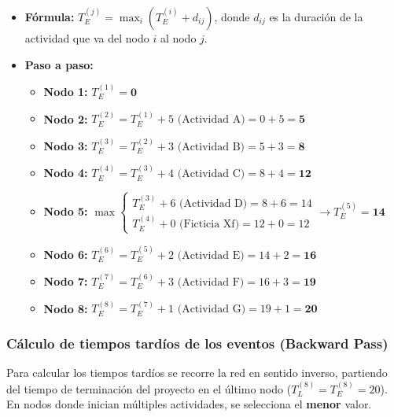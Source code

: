 \documentclass[12pt]{article}
\begin{document}
\begin{itemize}
    \item \textbf{Fórmula:} $T_E^{(j)} = \max_{i} (T_E^{(i)} + d_{ij})$, donde $d_{ij}$ es la duración de la actividad que va del nodo $i$ al nodo $j$.
    \item \textbf{Paso a paso:}
    \begin{itemize}
        \item \textbf{Nodo 1:} $T_E^{(1)} = \mathbf{0}$
        \item \textbf{Nodo 2:} $T_E^{(2)} = T_E^{(1)} + 5 \text{ (Actividad A)} = 0 + 5 = \mathbf{5}$
        \item \textbf{Nodo 3:} $T_E^{(3)} = T_E^{(2)} + 3 \text{ (Actividad B)} = 5 + 3 = \mathbf{8}$
        \item \textbf{Nodo 4:} $T_E^{(4)} = T_E^{(3)} + 4 \text{ (Actividad C)} = 8 + 4 = \mathbf{12}$
        \item \textbf{Nodo 5:} $\max \begin{cases} T_E^{(3)} + 6 \text{ (Actividad D)} = 8 + 6 = 14 \\ T_E^{(4)} + 0 \text{ (Ficticia Xf)} = 12 + 0 = 12 \end{cases} \rightarrow T_E^{(5)} = \mathbf{14}$
        \item \textbf{Nodo 6:} $T_E^{(6)} = T_E^{(5)} + 2 \text{ (Actividad E)} = 14 + 2 = \mathbf{16}$
        \item \textbf{Nodo 7:} $T_E^{(7)} = T_E^{(6)} + 3 \text{ (Actividad F)} = 16 + 3 = \mathbf{19}$
        \item \textbf{Nodo 8:} $T_E^{(8)} = T_E^{(7)} + 1 \text{ (Actividad G)} = 19 + 1 = \mathbf{20}$
    \end{itemize}
\end{itemize}

\subsubsection{Cálculo de tiempos tardíos de los eventos (Backward Pass)}
Para calcular los tiempos tardíos se recorre la red en sentido inverso, partiendo del tiempo de terminación del proyecto en el último nodo ($T_L^{(8)} = T_E^{(8)} = 20$). En nodos donde inician múltiples actividades, se selecciona el \textbf{menor} valor.
\end{document}
